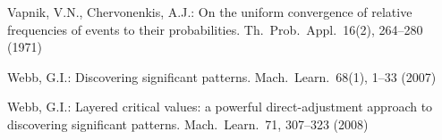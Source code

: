 \begin{thebibliography}{33}
Vapnik, V.N., Chervonenkis, A.J.: On the uniform convergence of relative
  frequencies of events to their probabilities.
\newblock Th.~Prob.~Appl.~16(2), 264--280 (1971)

Webb, G.I.: Discovering significant patterns.
\newblock Mach.~Learn.~68(1), 1--33 (2007)

Webb, G.I.: Layered critical values: a powerful direct-adjustment approach to
  discovering significant patterns.
\newblock Mach.~Learn.~71, 307--323 (2008)

\end{thebibliography}

